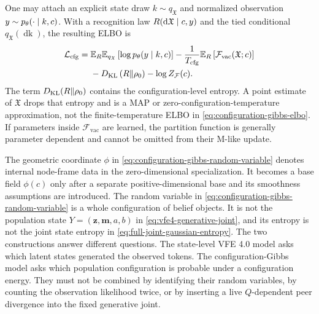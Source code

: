 One may attach an explicit state draw $k\sim q_{\mathfrak X}$ and normalized observation $y\sim p_\theta(\mathord{\cdot}\mid k,c)$. With a recognition law $R(\mathop{\mathrm d\mathfrak X}\mid c,y)$ and the tied conditional $q_{\mathfrak X}(\mathop{\mathrm dk})$, the resulting ELBO is
\begin{equation}
\begin{aligned}
\mathcal L_{\mathrm{cfg}}
={}&
\mathbb E_R\mathbb E_{q_{\mathfrak X}}
\left[
\log p_\theta(y\mid k,c)
\right]
-\frac{1}{T_{\mathrm{cfg}}}
\mathbb E_R
\left[
\mathcal F_{\mathrm{vac}}(\mathfrak X;c)
\right]\\
&-D_{\mathrm{KL}}\left(R\Vert\rho_0\right)
-\log Z_{\mathcal F}(c).
\end{aligned}
\label{eq:configuration-gibbs-elbo}
\end{equation}
The term $D_{\mathrm{KL}}(R\Vert\rho_0)$ contains the configuration-level entropy. A point estimate of $\mathfrak X$ drops that entropy and is a MAP or zero-configuration-temperature approximation, not the finite-temperature ELBO in \cref{eq:configuration-gibbs-elbo}. If parameters inside $\mathcal F_{\mathrm{vac}}$ are learned, the partition function is generally parameter dependent and cannot be omitted from their M-like update.

The geometric coordinate $\phi$ in \cref{eq:configuration-gibbs-random-variable} denotes internal node-frame data in the zero-dimensional specialization. It becomes a base field $\phi(c)$ only after a separate positive-dimensional base and its smoothness assumptions are introduced. The random variable in \cref{eq:configuration-gibbs-random-variable} is a whole configuration of belief objects. It is not the population state $Y=(\boldsymbol z,\boldsymbol m,a,b)$ in \cref{eq:vfe4-generative-joint}, and its entropy is not the joint state entropy in \cref{eq:full-joint-gaussian-entropy}. The two constructions answer different questions. The state-level VFE 4.0 model asks which latent states generated the observed tokens. The configuration-Gibbs model asks which population configuration is probable under a configuration energy. They must not be combined by identifying their random variables, by counting the observation likelihood twice, or by inserting a live $Q$-dependent peer divergence into the fixed generative joint.
